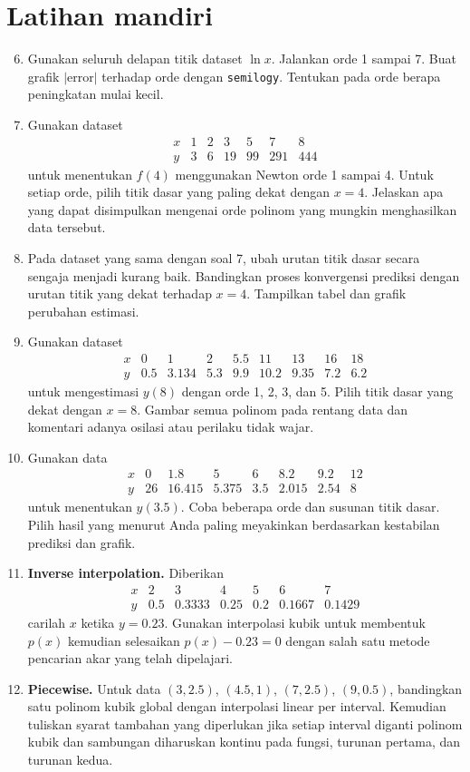 \section{Latihan mandiri}
\begin{enumerate}
\setcounter{enumi}{5}
\item Gunakan seluruh delapan titik dataset $\ln x$. Jalankan orde 1 sampai 7. Buat grafik $|\mathrm{error}|$ terhadap orde dengan \texttt{semilogy}. Tentukan pada orde berapa peningkatan mulai kecil.

\item Gunakan dataset
\[
\begin{array}{c|rrrrrr}
x&1&2&3&5&7&8\\\hline
y&3&6&19&99&291&444
\end{array}
\]
untuk menentukan $f(4)$ menggunakan Newton orde 1 sampai 4. Untuk setiap orde, pilih titik dasar yang paling dekat dengan $x=4$. Jelaskan apa yang dapat disimpulkan mengenai orde polinom yang mungkin menghasilkan data tersebut.

\item Pada dataset yang sama dengan soal 7, ubah urutan titik dasar secara sengaja menjadi kurang baik. Bandingkan proses konvergensi prediksi dengan urutan titik yang dekat terhadap $x=4$. Tampilkan tabel dan grafik perubahan estimasi.

\item Gunakan dataset
\[
\begin{array}{c|rrrrrrrr}
x&0&1&2&5.5&11&13&16&18\\\hline
y&0.5&3.134&5.3&9.9&10.2&9.35&7.2&6.2
\end{array}
\]
untuk mengestimasi $y(8)$ dengan orde 1, 2, 3, dan 5. Pilih titik dasar yang dekat dengan $x=8$. Gambar semua polinom pada rentang data dan komentari adanya osilasi atau perilaku tidak wajar.

\item Gunakan data
\[
\begin{array}{c|rrrrrrr}
x&0&1.8&5&6&8.2&9.2&12\\\hline
y&26&16.415&5.375&3.5&2.015&2.54&8
\end{array}
\]
untuk menentukan $y(3.5)$. Coba beberapa orde dan susunan titik dasar. Pilih hasil yang menurut Anda paling meyakinkan berdasarkan kestabilan prediksi dan grafik.

\item \textbf{Inverse interpolation.} Diberikan
\[
\begin{array}{c|rrrrrr}
x&2&3&4&5&6&7\\\hline
y&0.5&0.3333&0.25&0.2&0.1667&0.1429
\end{array}
\]
carilah $x$ ketika $y=0.23$. Gunakan interpolasi kubik untuk membentuk $p(x)$ kemudian selesaikan $p(x)-0.23=0$ dengan salah satu metode pencarian akar yang telah dipelajari.

\item \textbf{Piecewise.} Untuk data $(3,2.5)$, $(4.5,1)$, $(7,2.5)$, $(9,0.5)$, bandingkan satu polinom kubik global dengan interpolasi linear per interval. Kemudian tuliskan syarat tambahan yang diperlukan jika setiap interval diganti polinom kubik dan sambungan diharuskan kontinu pada fungsi, turunan pertama, dan turunan kedua.
\end{enumerate}
